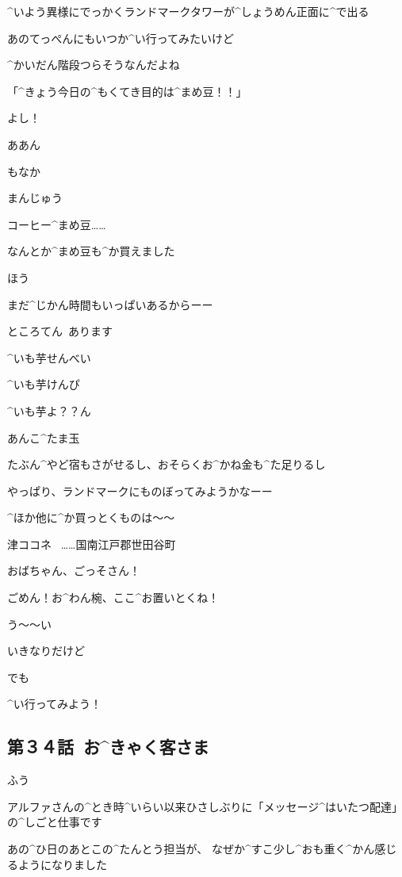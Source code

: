 \Alpha ^{いよう}{異様}にでっかくランドマークタワーが^{しょうめん}{正面}に^{で}{出}る

\page[16]
\Alpha あのてっぺんにもいつか^{い}{行}ってみたいけど

\Alpha ^{かいだん}{階段}つらそうなんだよね

\page[17]
\Alpha 「^{きょう}{今日}の^{もくてき}{目的}は^{まめ}{豆}！！」

\Alpha よし！

\page[18]
\Alpha ああん

\Sign もなか

\Sign まんじゅう

\Alpha コーヒー^{まめ}{豆}……

\Alpha なんとか^{まめ}{豆}も^{か}{買}えました

\Alpha ほう

\page[19]
\Alpha まだ^{じかん}{時間}もいっぱいあるからーー

\Sign ところてん\ あります

\Sign ^{いも}{芋}せんべい

\Sign ^{いも}{芋}けんぴ

\Sign ^{いも}{芋}よ？？ん

\Sign あんこ^{たま}{玉}

\Alpha たぶん^{やど}{宿}もさがせるし、おそらくお^{かね}{金}も^{た}{足}りるし

\page[20]
\Alpha やっぱり、ランドマークにものぼってみようかなーー

\Alpha ^{ほか}{他}に^{か}{買}っとくものは〜〜

\page[21]
\Sign 津ココネ
\ ……国南江戸郡世田谷町

\page[23]
\Alpha おばちゃん、ごっそさん！

\Alpha ごめん！お^{わん}{椀}、ここ^{お}{置}いとくね！

\Person う〜〜い

\page[24]
\Alpha いきなりだけど

\Alpha でも

\Alpha ^{い}{行}ってみよう！


\subsection{第３４話\ お^{きゃく}{客}さま}

\page[26]
\Kokone ふう

\Kokone アルファさんの^{とき}{時}^{いらい}{以来}ひさしぶりに「メッセージ^{はいたつ}{配達}」の^{しごと}{仕事}です

\page[27]
\Kokone あの^{ひ}{日}のあとこの^{たんとう}{担当}が、
なぜか^{すこ}{少}し^{おも}{重}く^{かん}{感}じるようになりました

